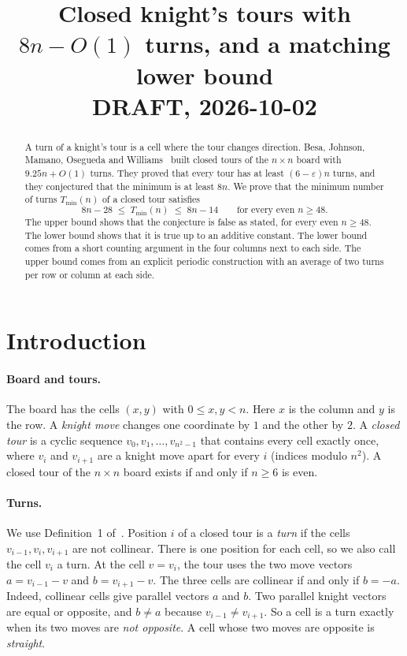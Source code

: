 \documentclass[11pt]{article}
\title{Closed knight's tours with $8n-O(1)$ turns, and a matching lower bound\\[4pt]
\large DRAFT, 2026-10-02}
\author{\todo{author list}}
\date{}
\theoremstyle{definition}
\theoremstyle{remark}
\newcommand{\Tmin}{T_{\min}}
\begin{document}
\maketitle

\begin{abstract}
A turn of a knight's tour is a cell where the tour changes direction.
Besa, Johnson, Mamano, Osegueda and Williams~\cite{bjmow} built closed tours of the $n\times n$ board with $9.25n+O(1)$ turns.
They proved that every tour has at least $(6-\varepsilon)n$ turns, and they conjectured that the minimum is at least $8n$.
We prove that the minimum number of turns $\Tmin(n)$ of a closed tour satisfies
\[ 8n-28 \;\le\; \Tmin(n) \;\le\; 8n-14 \qquad\text{for every even } n\ge 48. \]
The upper bound shows that the conjecture is false as stated, for every even $n\ge 48$.
The lower bound shows that it is true up to an additive constant.
The lower bound comes from a short counting argument in the four columns next to each side.
The upper bound comes from an explicit periodic construction with an average of two turns per row or column at each side.
\end{abstract}

\section{Introduction}

\paragraph{Board and tours.}
The board has the cells $(x,y)$ with $0\le x,y<n$.
Here $x$ is the column and $y$ is the row.
A \emph{knight move} changes one coordinate by $1$ and the other by $2$.
A \emph{closed tour} is a cyclic sequence $v_0,v_1,\dots,v_{n^2-1}$ that contains every cell exactly once, where $v_i$ and $v_{i+1}$ are a knight move apart for every $i$ (indices modulo $n^2$).
A closed tour of the $n\times n$ board exists if and only if $n\ge 6$ is even.

\paragraph{Turns.}
We use Definition~1 of~\cite{bjmow}.
Position $i$ of a closed tour is a \emph{turn} if the cells $v_{i-1},v_i,v_{i+1}$ are not collinear.
There is one position for each cell, so we also call the cell $v_i$ a turn.
At the cell $v=v_i$, the tour uses the two move vectors $a=v_{i-1}-v$ and $b=v_{i+1}-v$.
The three cells are collinear if and only if $b=-a$.
Indeed, collinear cells give parallel vectors $a$ and $b$.
Two parallel knight vectors are equal or opposite, and $b\ne a$ because $v_{i-1}\ne v_{i+1}$.
So a cell is a turn exactly when its two moves are \emph{not opposite}.
A cell whose two moves are opposite is \emph{straight}.
\end{document}
